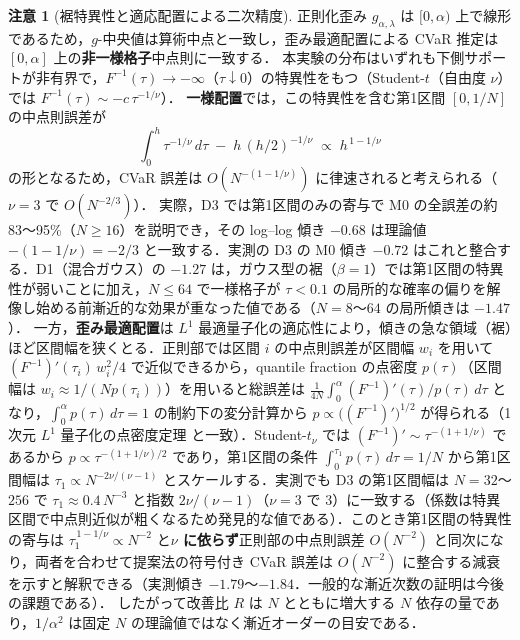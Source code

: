 \documentclass[a4paper,10pt]{jsarticle}
\theoremstyle{definition}
\newtheorem{remark}{注意}[section]
\newcommand{\Finv}{F^{-1}}
\begin{document}
\begin{remark}[裾特異性と適応配置による二次精度]
\label{rem:midpoint}
正則化歪み $g_{\alpha,\lambda}$ は $[0,\alpha)$ 上で線形であるため，$g$-中央値は算術中点と一致し，歪み最適配置による CVaR 推定は $[0,\alpha]$ 上の\textbf{非一様格子}中点則に一致する．
本実験の分布はいずれも下側サポートが非有界で，$\Finv(\tau)\to-\infty$（$\tau\downarrow0$）の特異性をもつ（Student-$t$（自由度 $\nu$）では $\Finv(\tau)\sim -c\,\tau^{-1/\nu}$）．
\textbf{一様配置}では，この特異性を含む第1区間 $[0,1/N]$ の中点則誤差が
\begin{equation*}
  \int_0^h\tau^{-1/\nu}\,d\tau\;-\;h\,(h/2)^{-1/\nu}\;\propto\; h^{\,1-1/\nu}
\end{equation*}
の形となるため，CVaR 誤差は $O(N^{-(1-1/\nu)})$ に律速されると考えられる（$\nu=3$ で $O(N^{-2/3})$）．
実際，D3 では第1区間のみの寄与で M0 の全誤差の約 83〜95\%（$N\ge16$）を説明でき，その log--log 傾き $-0.68$ は理論値 $-(1-1/\nu)=-2/3$ と一致する．実測の D3 の M0 傾き $-0.72$ はこれと整合する．D1（混合ガウス）の $-1.27$ は，ガウス型の裾（$\beta=1$）では第1区間の特異性が弱いことに加え，$N\le64$ で一様格子が $\tau<0.1$ の局所的な確率の偏りを解像し始める前漸近的な効果が重なった値である（$N=8$〜$64$ の局所傾きは $-1.47$）．
一方，\textbf{歪み最適配置}は $L^1$ 最適量子化の適応性により，傾きの急な領域（裾）ほど区間幅を狭くとる．正則部では区間 $i$ の中点則誤差が区間幅 $w_i$ を用いて $(\Finv)'(\tau_i)\,w_i^2/4$ で近似できるから，quantile fraction の点密度 $p(\tau)$（区間幅は $w_i\approx1/(Np(\tau_i))$）を用いると総誤差は $\frac{1}{4N}\int_0^\alpha(\Finv)'(\tau)/p(\tau)\,d\tau$ となり，$\int_0^\alpha p(\tau)\,d\tau=1$ の制約下の変分計算から $p\propto\bigl((\Finv)'\bigr)^{1/2}$ が得られる（1次元 $L^1$ 量子化の点密度定理 \cite{graf2000quantization} と一致）．Student-$t_\nu$ では $(\Finv)'\sim\tau^{-(1+1/\nu)}$ であるから $p\propto\tau^{-(1+1/\nu)/2}$ であり，第1区間の条件 $\int_0^{\tau_1}p(\tau)\,d\tau=1/N$ から第1区間幅は $\tau_1\propto N^{-2\nu/(\nu-1)}$ とスケールする．実測でも D3 の第1区間幅は $N=32$〜$256$ で $\tau_1\approx0.4\,N^{-3}$ と指数 $2\nu/(\nu-1)$（$\nu=3$ で $3$）に一致する（係数は特異区間で中点則近似が粗くなるため発見的な値である）．このとき第1区間の特異性の寄与は $\tau_1^{\,1-1/\nu}\propto N^{-2}$ と\textbf{$\nu$ に依らず}正則部の中点則誤差 $O(N^{-2})$ と同次になり，両者を合わせて提案法の符号付き CVaR 誤差は $O(N^{-2})$ に整合する減衰を示すと解釈できる（実測傾き $-1.79$〜$-1.84$．一般的な漸近次数の証明は今後の課題である）．
したがって改善比 $R$ は $N$ とともに増大する $N$ 依存の量であり，$1/\alpha^2$ は固定 $N$ の理論値ではなく漸近オーダーの目安である．
\end{remark}
\end{document}
